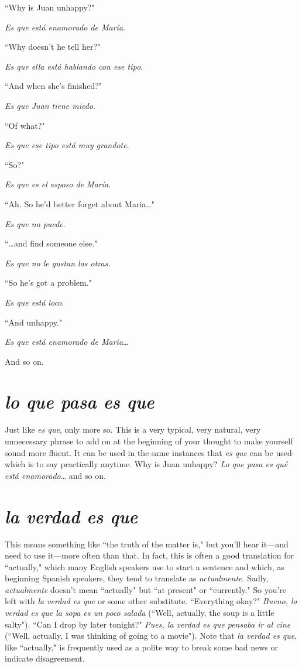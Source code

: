 \bsk

\inda ``Why is Juan unhappy?"

\indu \emph{Es que está enamorado de María}.

\inda ``Why doesn't he tell her?"

\indu \emph{Es que ella está hablando con ese tipo}.

\inda ``And when she's finished?"

\indu \emph{Es que Juan tiene miedo}.

\inda ``Of what?"

\indu \emph{Es que ese tipo está muy grandote}.

\inda ``So?"

\indu \emph{Es que es el esposo de María}.

\inda ``Ah. So he'd better forget about Maria\ldots{}"

\indu \emph{Es que no puede}.

\inda ``\ldots{}and find someone else."

\indu \emph{Es que no le gustan las otras}.

\inda ``So he's got a problem."

\indu \emph{Es que está loco}.

\inda ``And unhappy."

\indu \emph{Es que está enamorado de Maria}\ldots{}

\bsk

And so on.

\section{\emph{lo que pasa es que}}

Just like \emph{es que}, only more so. This is a very typical, very
natural, very unnecessary phrase to add on at the beginning of your
thought to make yourself sound more fluent. It can be used in the
same instances that \emph{es que} can be used-which is to say practically
anytime. Why is Juan unhappy? \emph{Lo que pasa es qué está
enamorado}\ldots{} and so on.

\section{\emph{la verdad es que}}

This means something like ``the truth of the matter is," but
you'll hear it---and need to use it---more often than that. In fact, this is
often a good translation for ``actually," which many English speakers
use to start a sentence and which, as beginning Spanish speakers, they
tend to translate as \emph{actualmente}. Sadly, \emph{actualmente} doesn't mean
``actually" but ``at present" or ``currently." So you're left with \emph{la verdad es que} or some other substitute. ``Everything okay?" \emph{Bueno, la
verdad es que la sopa es un poco salada} (``Well, actually, the soup is a
little salty"). ``Can I drop by later tonight?" \emph{Pues, la verdad es que pensaba ir al cine} (``Well, actually, I was thinking of going to a movie").
Note that \emph{la verdad es que}, like ``actually," is frequently used as a polite way to break some bad news or indicate disagreement.

